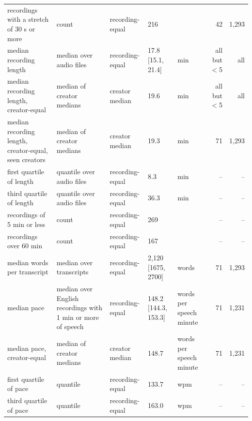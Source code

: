 {\begin{tabular}{@{}p{}p{}p{}lp{}rr@{}}
recordings with a stretch of 30 s or more & count & recording-equal & 216 &  & 42 & 1{,}293 \\
median recording length & median over audio files & recording-equal & 17.8 [15.1, 21.4] & min & all but $<$5 & all \\
median recording length, creator-equal & median of creator medians & creator median & 19.6 & min & all but $<$5 & all \\
median recording length, creator-equal, seen creators & median of creator medians & creator median & 19.3 & min & 71 & 1{,}293 \\
first quartile of length & quantile over audio files & recording-equal & 8.3 & min & -- & -- \\
third quartile of length & quantile over audio files & recording-equal & 36.3 & min & -- & -- \\
recordings of 5 min or less & count & recording-equal & 269 &  & -- & -- \\
recordings over 60 min & count & recording-equal & 167 &  & -- & -- \\
median words per transcript & median over transcripts & recording-equal & 2{,}120 [1675, 2700] & words & 71 & 1{,}293 \\
median pace & median over English recordings with 1 min or more of speech & recording-equal & 148.2 [144.3, 153.3] & words per speech minute & 71 & 1{,}231 \\
median pace, creator-equal & median of creator medians & creator median & 148.7 & words per speech minute & 71 & 1{,}231 \\
first quartile of pace & quantile & recording-equal & 133.7 & wpm & -- & -- \\
third quartile of pace & quantile & recording-equal & 163.0 & wpm & -- & -- \\
\bottomrule
\end{tabular}}
